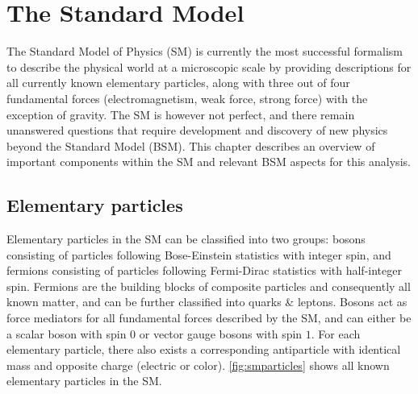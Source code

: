 \documentclass[../thesis.tex]{subfiles}
\begin{document}
\vspace{-1\baselineskip}

\section{The Standard Model}
\label{sec:SM}
The Standard Model of Physics (\acs{SM}) \citep{theory:SM} is currently the most successful formalism to describe the physical world at a microscopic scale by providing descriptions for all currently known elementary particles, along with three out of four fundamental forces (electromagnetism, weak force, strong force) with the exception of gravity. The \acs{SM} is however not perfect, and there remain unanswered questions that require development and discovery of new physics beyond the Standard Model (\acs{BSM}). This chapter describes an overview of important components within the \acs{SM} and relevant \acs{BSM} aspects for this analysis.

\subsection{Elementary particles}
Elementary particles in the \acs{SM} can be classified into two groups: bosons consisting of particles following Bose-Einstein statistics with integer spin, and fermions consisting of particles following Fermi-Dirac statistics with half-integer spin. Fermions are the building blocks of composite particles and consequently all known matter, and can be further classified into quarks \& leptons. Bosons act as force mediators for all fundamental forces described by the \acs{SM}, and can either be a scalar boson with spin $0$ or vector gauge bosons with spin $1$. For each elementary particle, there also exists a corresponding antiparticle with identical mass and opposite charge (electric or color). \autoref{fig:smparticles} shows all known elementary particles in the \acs{SM}.
\end{document}
